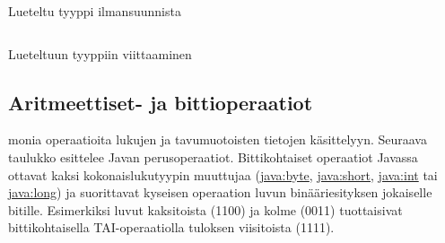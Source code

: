 \documentclass{tufte-book}
\newcommand{\java}[1]{\underline{\gls{java:#1}}}
\newcommand{\code}[3]{
\begin{listing}
    \inputminted{java}{OhjelmointiopasEsimerkit/src/#1/#2.java}
    \caption{#3}
    \label{Java-#1-#2}
\end{listing}
}
\begin{document}
\code{week3/enumexample}{CompassPoint}{Lueteltu tyyppi ilmansuunnista}
\code{week3/enumexample}{EnumExample}{Lueteltuun tyyppiin viittaaminen}

\subsection{Aritmeettiset- ja bittioperaatiot}
\label{operaatiot}

 monia operaatioita lukujen ja tavumuotoisten tietojen käsittelyyn.
Seuraava taulukko esittelee Javan perusoperaatiot. Bittikohtaiset operaatiot Javassa ottavat
kaksi kokonaislukutyypin muuttujaa (\java{byte}, \java{short}, \java{int} tai \java{long}) ja
suorittavat kyseisen operaation luvun binääriesityksen jokaiselle bitille. Esimerkiksi luvut
kaksitoista (1100) ja kolme (0011) tuottaisivat bittikohtaisella TAI-operaatiolla tuloksen
viisitoista (1111).
\end{document}
